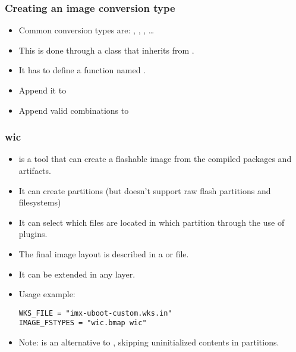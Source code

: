 \begin{frame}
  \frametitle{Creating an image conversion type}
  \begin{itemize}
    \item Common conversion types are: , ,
          , \dots
    \item This is done through a class that inherits from
      .
    \item It has to define a function named .
    \item Append it to 
    \item Append valid combinations to 
  \end{itemize}
\end{frame}

\begin{frame}[fragile]
  \frametitle{wic}
  \begin{itemize}
    \item {} is a tool that can create a flashable image from
      the compiled packages and artifacts.
    \item It can create partitions (but doesn't support raw flash partitions
          and filesystems)
    \item It can select which files are located in
      which partition through the use of plugins.
    \item The final image layout is described in a  or
       file.
    \item It can be extended in any layer.
    \item Usage example:
      \begin{block}{}
        \begin{verbatim}
WKS_FILE = "imx-uboot-custom.wks.in"
IMAGE_FSTYPES = "wic.bmap wic"
        \end{verbatim}
      \end{block}
    \item Note:  is an alternative to ,
      skipping uninitialized contents in partitions.
  \end{itemize}
\end{frame}

